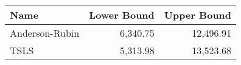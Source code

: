 
\begin{tabular}{lrr}
\toprule
Name & Lower Bound & Upper Bound\\
\midrule
Anderson-Rubin & 6,340.75 & 12,496.91\\
TSLS & 5,313.98 & 13,523.68\\
\bottomrule
\end{tabular}
